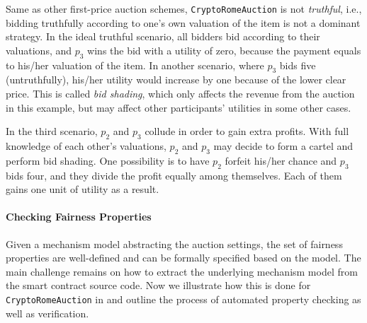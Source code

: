 Same as other first-price auction schemes, \texttt{CryptoRomeAuction} is not \emph{truthful}, i.e.,
bidding truthfully according to one's own valuation of the item is not a dominant strategy.
In the ideal truthful scenario, all bidders bid according to their valuations, and $p_3$ wins the
bid with a utility of zero, because the payment equals to his/her valuation of the item.
In another scenario, where $p_3$ bids five (untruthfully), his/her utility would increase by one because
of the lower clear price.
This is called \emph{bid shading}, which only affects the revenue from the auction in this example,
but may affect other participants' utilities in some other cases.

In the third scenario, $p_2$ and $p_3$ collude in order to gain extra profits.
With full knowledge of each other's valuations, $p_2$ and $p_3$ may decide to form a cartel and
perform bid shading.
One possibility is to have $p_2$ forfeit his/her chance and $p_3$ bids four, and they divide the
profit equally among themselves.
Each of them gains one unit of utility as a result.


\paragraph{Checking Fairness Properties}
Given a mechanism model abstracting the auction settings, the set of fairness properties are
well-defined and can be formally specified based on the model.
The main challenge remains on how to extract the underlying mechanism model from the smart contract
source code.
Now we illustrate how this is done for \texttt{CryptoRomeAuction} in \tool and outline the process
of automated property checking as well as verification.


